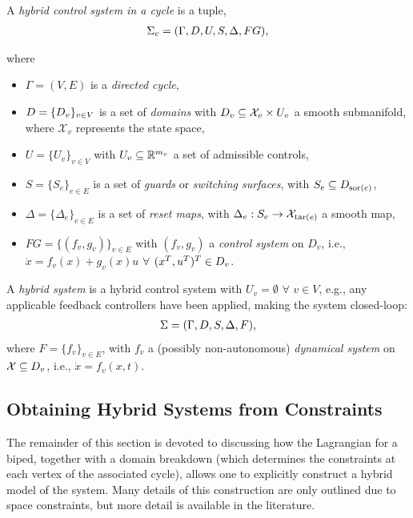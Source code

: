 \begin{definition} A {\em hybrid control system in a cycle} is a tuple,
\begin{align}
  \Sigma_{c} = (\Gamma, D, U, S, \Delta, FG),
\end{align}
\end{definition}
where
\begin{itemize}
  \item $\Gamma = (V,E)$ is a {\em directed cycle},
  \item $D = \{D_{v}\}_{v \in V}$ is a set of {\em domains} with $D_{v} \subseteq \mathcal{X}_{v} \times U_v$ a smooth submanifold, where $\mathcal{X}_{v}$ represents the state space,
  \item $U = \{U_{v}\}_{v \in V}$ with $U_{v} \subseteq \mathbb{R}^{m_{v}}$ a set of admissible controls,
  \item $S = \{S_{e}\}_{e \in E}$ is a set of {\em guards} or {\em switching surfaces}, with $S_{e} \subseteq D_{\mathrm{sor}(e)}$,
  \item $\Delta = \{\Delta_{e}\}_{e \in E}$ is a set of {\em reset maps}, with $\Delta_{e} : S_{e} \to \mathcal{X}_{\mathrm{tar}(e)}$ a smooth map,
  \item $FG = \{(f_{v}, g_{v})\}_{v \in E}$ with $(f_v,g_v)$ a {\em control system} on $D_{v}$, i.e., $\dot{x} = f_{v}(x) + g_{v}(x) u$ $\forall$ $(x^{T}, u^{T})^{T} \in D_{v}$.
\end{itemize}
A {\em hybrid system} is a hybrid control system with $U_v = \emptyset$ $\forall$ $v \in V$, e.g., any applicable feedback controllers have been applied, making the system closed-loop:
\begin{align}
  \Sigma = (\Gamma, D, S, \Delta, F),
\end{align}
where $F = \{f_{v}\}_{v \in E}$, with $f_{v}$ a (possibly non-autonomous) {\em dynamical system} on $\mathcal{X} \subseteq D_{v}$, i.e., $\dot{x} = f_{v}(x,t)$.

\subsection{Obtaining Hybrid Systems from Constraints}
The remainder of this section is devoted to discussing how the Lagrangian for a biped, together with a domain breakdown (which determines the constraints at each vertex of the associated cycle), allows one to explicitly construct a hybrid model of the system.  Many details of this construction are only outlined due to space constraints, but more detail is available in the literature.\cite{GCAS10}


